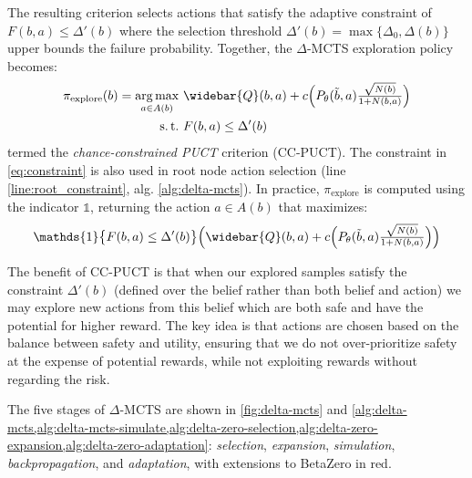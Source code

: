The resulting criterion selects actions that satisfy the adaptive constraint of $F(b,a) \le \Delta'(b)$ where the selection threshold $\Delta'(b) = \max \{\Delta_0, \Delta(b)\}$ upper bounds the failure probability.
Together, the $\Delta$-MCTS exploration policy becomes:
{\small\begin{align}
    \pi_\text{explore}(b) = \argmax_{a \in A(b)}& \ \widebar{Q}(b, a) + c \Big(P_\theta(\tilde{b},a) \textstyle\frac{\sqrt{N(b)}}{1 + N(b,a)} \Big)\\
                             \operatorname{s.t.}& \ F(b,a) \le \Delta'(b) \label{eq:constraint}
\end{align}}%
termed the \textit{chance-constrained PUCT} criterion (CC-PUCT).
The constraint in \cref{eq:constraint} is also used in root node action selection (line \ref*{line:root_constraint}, alg. \ref{alg:delta-mcts}).
In practice, $\pi_\text{explore}$ is computed using the indicator $\mathds{1}$, returning the action $a \in A(b)$ that maximizes:
\begin{equation*}
\mathds{1}\big\{F(b,a) \le \Delta'(b) \big\} \Big(\widebar{Q}(b, a) + c \Big(P_\theta(\tilde{b},a) \textstyle\frac{\sqrt{N(b)}}{1 + N(b,a)} \Big) \Big)
\end{equation*}

The benefit of CC-PUCT is that when our explored samples satisfy the constraint $\Delta'(b)$ (defined over the belief rather than both belief and action) we may explore new actions from this belief which are both safe and have the potential for higher reward.
The key idea is that actions are chosen based on the balance between safety and utility, ensuring that we do not over-prioritize safety at the expense of potential rewards, while not exploiting rewards without regarding the risk.

The five stages of $\Delta$-MCTS are shown in \cref{fig:delta-mcts} and \cref{alg:delta-mcts,alg:delta-mcts-simulate,alg:delta-zero-selection,alg:delta-zero-expansion,alg:delta-zero-adaptation}: \textit{selection}, \textit{expansion}, \textit{simulation}, \textit{backpropagation}, and \textit{adaptation}, with extensions to BetaZero in red.


\begin{figure}[h!]
    \centering
    
    
\end{figure}

\begin{figure}[!ht]
    \centering
    
    
    
\end{figure}


